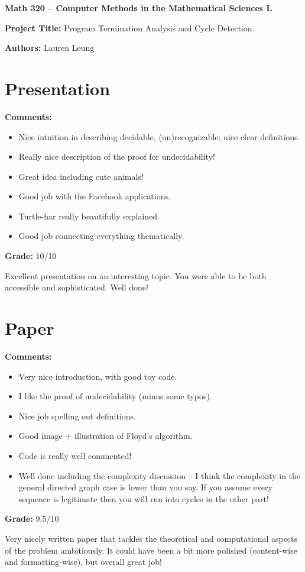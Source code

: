 \documentclass[12pt]{article}
\begin{document}
{\bf \large Math 320 -- Computer Methods in the Mathematical Sciences I.}\\

\vspace{3mm}

{\bf \large Project Title:} Program Termination Analysis and Cycle Detection. \\
\vspace{2mm}

{\bf \large Authors:} Lauren Leung\\

\vspace{3mm}

\section{Presentation}
{\bf \large Comments:}
\begin{itemize}
\item Nice intuition in describing decidable, (un)recognizable; nice clear
definitions.
\item Really nice description of the proof for undecidability!
\item Great idea including cute animals!
\item Good job with the Facebook applications.
\item Turtle-har really beautifully explained.
\item Good job connecting everything thematically.
\end{itemize}

{\bf \large Grade:} 10/10

Excellent presentation on an interesting topic. You were 
able to be both accessible and sophisticated. Well done!

\section{Paper}

{\bf \large Comments:}
\begin{itemize}
\item Very nice introduction, with good toy code.
\item I like the proof of undecidability (minus some typos).
\item Nice job spelling out definitions.
\item Good image + illustration of Floyd's algorithm.
\item Code is really well commented!
\item Well done including the complexity discussion -- I think the
complexity in the general directed graph case is lower than you say.
If you assume every sequence is legitimate then you will run into cycles
in the other part!
\end{itemize}

{\bf \large Grade:} 9.5/10

Very nicely written paper that tackles the theoretical and
computational aspects of the problem ambitiously. It could have
been a bit more polished (content-wise and formatting-wise), but
overall great job!
\end{document}
